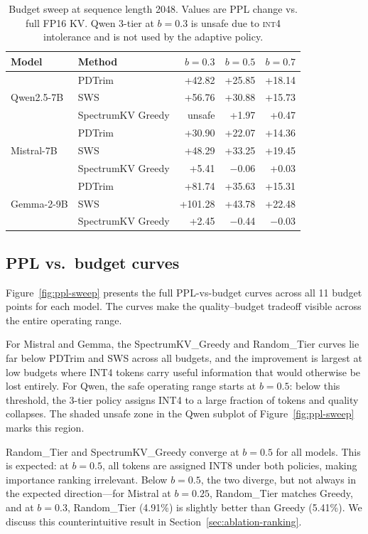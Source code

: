 \documentclass[11pt]{article}
\newcommand{\method}{SpectrumKV}
\newcommand{\budget}{b}
\newcommand{\pct}{\%}
\newcommand{\intiv}{\textsc{int4}}
\theoremstyle{plain}
\theoremstyle{definition}
\begin{document}
\begin{table}[t]
\centering
\caption{Budget sweep at sequence length 2048.  Values are PPL change vs. full FP16 KV.  Qwen 3-tier at $\budget=0.3$ is unsafe due to \intiv{} intolerance and is not used by the adaptive policy.}
\label{tab:budget}
\small
\begin{tabular}{llrrr}
\toprule
Model & Method & $\budget=0.3$ & $\budget=0.5$ & $\budget=0.7$ \\
\midrule
\multirow{3}{*}{Qwen2.5-7B}
  & PDTrim & +42.82 & +25.85 & +18.14 \\
  & SWS & +56.76 & +30.88 & +15.73 \\
  & \method{} Greedy & unsafe & +1.97 & +0.47 \\
\midrule
\multirow{3}{*}{Mistral-7B}
  & PDTrim & +30.90 & +22.07 & +14.36 \\
  & SWS & +48.29 & +33.25 & +19.45 \\
  & \method{} Greedy & +5.41 & $-$0.06 & +0.03 \\
\midrule
\multirow{3}{*}{Gemma-2-9B}
  & PDTrim & +81.74 & +35.63 & +15.31 \\
  & SWS & +101.28 & +43.78 & +22.48 \\
  & \method{} Greedy & +2.45 & $-$0.44 & $-$0.03 \\
\bottomrule
\end{tabular}
\end{table}

\subsection{PPL vs.\ budget curves}
\label{sec:ppl-curves}

Figure~\ref{fig:ppl-sweep} presents the full PPL-vs-budget curves across all 11 budget points for each model.  The curves make the quality--budget tradeoff visible across the entire operating range.

For Mistral and Gemma, the \method{}\_Greedy and Random\_Tier curves lie far below PDTrim and SWS across all budgets, and the improvement is largest at low budgets where INT4 tokens carry useful information that would otherwise be lost entirely.  For Qwen, the safe operating range starts at $\budget=0.5$: below this threshold, the 3-tier policy assigns INT4 to a large fraction of tokens and quality collapses.  The shaded unsafe zone in the Qwen subplot of Figure~\ref{fig:ppl-sweep} marks this region.

Random\_Tier and \method{}\_Greedy converge at $\budget=0.5$ for all models.  This is expected: at $\budget=0.5$, all tokens are assigned INT8 under both policies, making importance ranking irrelevant.  Below $\budget=0.5$, the two diverge, but not always in the expected direction---for Mistral at $\budget=0.25$, Random\_Tier matches Greedy, and at $\budget=0.3$, Random\_Tier (4.91\pct{}) is slightly better than Greedy (5.41\pct{}).  We discuss this counterintuitive result in Section~\ref{sec:ablation-ranking}.
\end{document}
